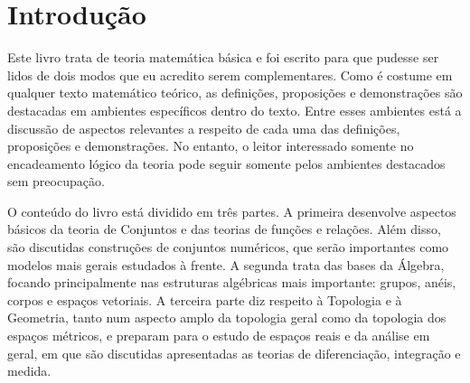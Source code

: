 {}
\chapter*{Introdução}

Este livro trata de teoria matemática básica e foi escrito para que pudesse ser lidos de dois modos que eu acredito serem complementares. Como é costume em qualquer texto matemático teórico, as definições, proposições e demonstrações são destacadas em ambientes específicos dentro do texto. Entre esses ambientes está a discussão de aspectos relevantes a respeito de cada uma das definições, proposições e demonstrações. No entanto, o leitor interessado somente no encadeamento lógico da teoria pode seguir somente pelos ambientes destacados sem preocupação.

O conteúdo do livro está dividido em três partes. A primeira desenvolve aspectos básicos da teoria de Conjuntos e das teorias de funções e relações. Além disso, são discutidas construções de conjuntos numéricos, que serão importantes como modelos mais gerais estudados à frente. A segunda trata das bases da Álgebra, focando principalmente nas estruturas algébricas mais importante: grupos, anéis, corpos e espaços vetoriais. A terceira parte diz respeito à Topologia e à Geometria, tanto num aspecto amplo da topologia geral como da topologia dos espaços métricos, e preparam para o estudo de espaços reais e da análise em geral, em que são discutidas apresentadas as teorias de diferenciação, integração e medida.